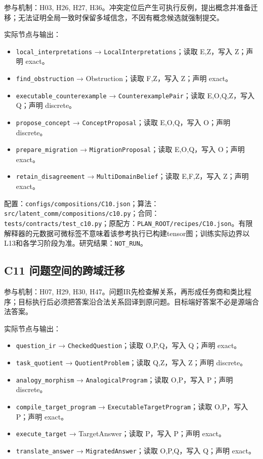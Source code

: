 \documentclass[
  10pt,
]{article}
\begin{document}
参与机制：H03, H26, H27,
H36。冲突定位后产生可执行反例，提出概念并准备迁移；无法证明全局一致时保留多域信念，不因有概念候选就强制提交。

实际节点与输出：

\begin{itemize}
\item
  \nolinkurl{local_interpretations} →
  \nolinkurl{LocalInterpretations}；读取 E,Z，写入 Z；声明 exact。
\item
  \nolinkurl{find_obstruction} → Obstruction；读取 F,Z，写入 Z；声明
  exact。
\item
  \nolinkurl{executable_counterexample} →
  \nolinkurl{CounterexamplePair}；读取 E,O,Q,Z，写入 Q；声明 discrete。
\item
  \nolinkurl{propose_concept} → \nolinkurl{ConceptProposal}；读取
  E,O,Q，写入 O；声明 discrete。
\item
  \nolinkurl{prepare_migration} → \nolinkurl{MigrationProposal}；读取
  E,O,Q，写入 O；声明 exact。
\item
  \nolinkurl{retain_disagreement} → \nolinkurl{MultiDomainBelief}；读取
  E,F,Z，写入 Z；声明 exact。
\end{itemize}

配置：{\small\nolinkurl{configs/compositions/C10.json}}；算法：{\small\nolinkurl{src/latent_comm/compositions/c10.py}}；合同：{\small\nolinkurl{tests/contracts/test_c10.py}}；原配方：{\small\nolinkurl{PLAN_ROOT/recipes/C10.json}}。有限解释器的元数据可微标签不意味着该参考执行已构建tensor图；训练实际边界以L13和各学习阶段为准。研究结果：\nolinkurl{NOT_RUN}。

\subsection{C11
问题空间的跨域迁移}\label{c11-ux95eeux9898ux7a7aux95f4ux7684ux8de8ux57dfux8fc1ux79fb}

参与机制：H07, H29, H30,
H47。问题IR先检查解关系，再形成任务商和类比程序；目标执行后必须把答案沿合法关系回译到原问题。目标端好答案不必是源端合法答案。

实际节点与输出：

\begin{itemize}
\item
  \nolinkurl{question_ir} → \nolinkurl{CheckedQuestion}；读取
  O,P,Q，写入 Q；声明 exact。
\item
  \nolinkurl{task_quotient} → \nolinkurl{QuotientProblem}；读取
  Q,Z，写入 Z；声明 discrete。
\item
  \nolinkurl{analogy_morphism} → \nolinkurl{AnalogicalProgram}；读取
  O,P，写入 P；声明 discrete。
\item
  \nolinkurl{compile_target_program} →
  \nolinkurl{ExecutableTargetProgram}；读取 O,P，写入 P；声明 exact。
\item
  \nolinkurl{execute_target} → TargetAnswer；读取 P，写入 P；声明
  exact。
\item
  \nolinkurl{translate_answer} → \nolinkurl{MigratedAnswer}；读取
  O,P,Q，写入 Q；声明 exact。
\end{itemize}
\end{document}
